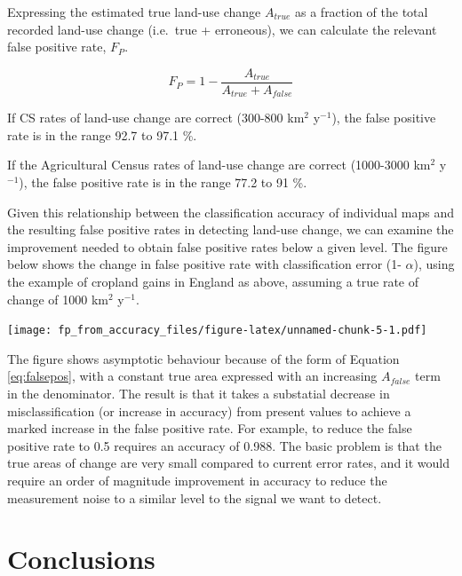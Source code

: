 \documentclass[
]{book}
\begin{document}
Expressing the estimated true land-use change \(A_{true}\) as a fraction of the total recorded land-use change (i.e.~true + erroneous), we can calculate the relevant false positive rate, \(F_P\).

\begin{equation} \label{eq:falsepos}
  F_P = 1 - \frac{A_{true}}{A_{true} + A_{false}}
\end{equation}

If CS rates of land-use change are correct (300-800 km\(^2\) y\(^{-1}\)), the false positive rate is in the range 92.7 to 97.1 \%.

If the Agricultural Census rates of land-use change are correct (1000-3000 km\(^2\) y\(^{-1}\)), the false positive rate is in the range 77.2 to 91 \%.

Given this relationship between the classification accuracy of individual maps and the resulting false positive rates in detecting land-use change, we can examine the improvement needed to obtain false positive rates below a given level. The figure below shows the change in false positive rate with classification error (1- \(\alpha\)), using the example of cropland gains in England as above, assuming a true rate of change of 1000 km\(^2\) y\(^{-1}\).

\texttt{[image: fp\_from\_accuracy\_files/figure-latex/unnamed-chunk-5-1.pdf]}

The figure shows asymptotic behaviour because of the form of Equation \ref{eq:falsepos}, with a constant true area expressed with an increasing \(A_{false}\) term in the denominator. The result is that it takes a substatial decrease in misclassification (or increase in accuracy) from present values to achieve a marked increase in the false positive rate. For example, to reduce the false positive rate to 0.5 requires an accuracy of 0.988. The basic problem is that the true areas of change are very small compared to current error rates, and it would require an order of magnitude improvement in accuracy to reduce the measurement noise to a similar level to the signal we want to detect.

\hypertarget{conclusions-1}{%
\section{Conclusions}\label{conclusions-1}}
\end{document}
